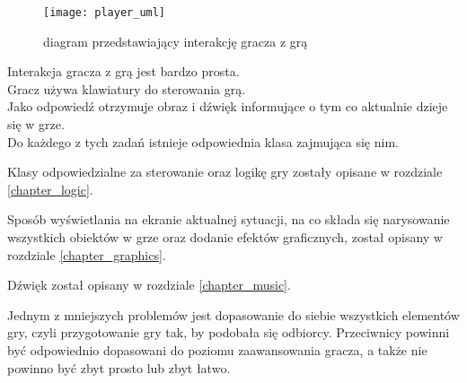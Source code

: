 \newpage
\begin{wrapfigure}{l}{0.5\textwidth}
	\centering
	\noindent\texttt{[image: player\_uml]}
	\caption{diagram przedstawiający interakcję gracza z grą}
\end{wrapfigure}
Interakcja gracza z grą jest bardzo prosta.\\
Gracz używa klawiatury do sterowania grą.\\
Jako odpowiedź otrzymuje obraz i dźwięk informujące o tym co aktualnie dzieje się w grze.\\
Do każdego z tych zadań istnieje odpowiednia klasa zajmująca się nim.

Klasy odpowiedzialne za sterowanie oraz logikę gry zostały opisane w rozdziale \ref{chapter_logic}.

Sposób wy\'swietlania na ekranie aktualnej sytuacji, na co składa się narysowanie wszystkich obiektów w grze oraz dodanie efektów graficznych, został opisany w rozdziale \ref{chapter_graphics}.

Dźwięk został opisany w rozdziale \ref{chapter_music}.

Jednym z mniejszych problemów jest dopasowanie do siebie wszystkich elementów gry, czyli przygotowanie gry tak, by podobała się odbiorcy. Przeciwnicy powinni być odpowiednio dopasowani do poziomu zaawansowania gracza, a także nie powinno być zbyt prosto lub zbyt łatwo.

\cleardoublepage